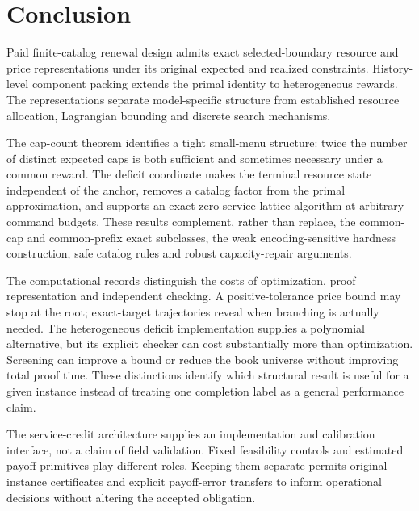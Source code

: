 \section{Conclusion}
Paid finite-catalog renewal design admits exact selected-boundary resource and price representations under its original expected and realized constraints. History-level component packing extends the primal identity to heterogeneous rewards. The representations separate model-specific structure from established resource allocation, Lagrangian bounding and discrete search mechanisms.

The cap-count theorem identifies a tight small-menu structure: twice the number of distinct expected caps is both sufficient and sometimes necessary under a common reward. The deficit coordinate makes the terminal resource state independent of the anchor, removes a catalog factor from the primal approximation, and supports an exact zero-service lattice algorithm at arbitrary command budgets. These results complement, rather than replace, the common-cap and common-prefix exact subclasses, the weak encoding-sensitive hardness construction, safe catalog rules and robust capacity-repair arguments.

The computational records distinguish the costs of optimization, proof representation and independent checking. A positive-tolerance price bound may stop at the root; exact-target trajectories reveal when branching is actually needed. The heterogeneous deficit implementation supplies a polynomial alternative, but its explicit checker can cost substantially more than optimization. Screening can improve a bound or reduce the book universe without improving total proof time. These distinctions identify which structural result is useful for a given instance instead of treating one completion label as a general performance claim.

The service-credit architecture supplies an implementation and calibration interface, not a claim of field validation. Fixed feasibility controls and estimated payoff primitives play different roles. Keeping them separate permits original-instance certificates and explicit payoff-error transfers to inform operational decisions without altering the accepted obligation.

